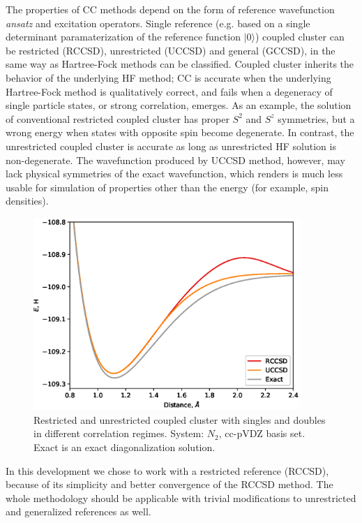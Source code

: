 The properties of CC methods depend on the form of reference wavefunction 
\emph{ansatz} and excitation operators. Single reference (e.g. based on 
a single determinant paramaterization of the reference function $| 0 \rangle$) 
coupled cluster can be restricted (RCCSD),\cite{scuseria_ccsd} unrestricted 
(UCCSD) and general (GCCSD), in the same way as Hartree-Fock methods can be 
classified. Coupled cluster inherits the behavior of the 
underlying HF method; CC is accurate when the underlying Hartree-Fock method is 
qualitatively correct, and fails when a degeneracy of single particle states, or 
strong correlation, emerges. As an example, the solution of conventional 
restricted coupled cluster has proper $S^{2}$ and $S^{z}$ symmetries, 
but a wrong energy when states with opposite spin become degenerate. 
In contrast, the unrestricted coupled cluster is accurate as long as 
unrestricted HF solution is non-degenerate. The 
wavefunction produced by UCCSD method, however, may lack physical symmetries of 
the exact wavefunction, which renders is much less usable for simulation of 
properties other than the energy (for example, spin densities). 
%
\begin{figure}[!ht]
\centering
 \includegraphics[width=0.9\textwidth]{figures/tcc_theory/rccsd_uccsd_fci}
 \caption{Restricted and unrestricted coupled cluster with singles and doubles 
in different correlation regimes. System: $N_{2}$, cc-pVDZ basis set. Exact is 
an exact diagonalization solution.}
\end{figure}
%
In this development we chose to work with a restricted reference (RCCSD), 
because of its simplicity and better convergence of the RCCSD method. The whole 
methodology should be applicable with trivial modifications to unrestricted and 
generalized references as well.

